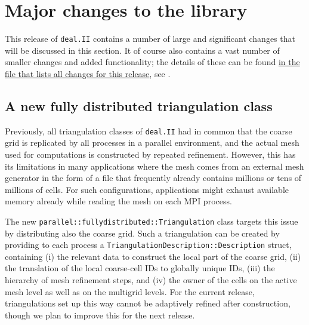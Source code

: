 \documentclass{ansarticle-preprint}
\newcommand{\specialword}[1]{\texttt{#1}}
\newcommand{\dealii}{{\specialword{deal.II}}\xspace}
\begin{document}
\section{Major changes to the library}
\label{sec:major}

This release of \dealii{} contains a number of large and significant changes
that will be discussed in this section.
It of course also contains a
vast number of smaller changes and added functionality; the details of these
can be found
\href{https://dealii.org/developer/doxygen/deal.II/changes_between_9_1_1_and_9_2_0.html}{
in the file that lists all changes for this release}, see \cite{changes92}.


\subsection{A new fully distributed triangulation class}
\label{subsec:pft}

Previously, all triangulation classes of \dealii{} had in common that the coarse grid is replicated by
all processes in a parallel environment, and the actual mesh used for computations is constructed by repeated
refinement. However, this has its limitations in many
applications where the mesh comes
from an external mesh generator in the form of a file that frequently
already contains millions
or tens of millions of cells. For such configurations, applications might exhaust
available memory already while reading the mesh on each MPI process.

The new \texttt{parallel::fullydistributed::Triangulation} class targets this issue
by distributing also the coarse grid. Such
a triangulation can be created by providing to each process a \texttt{Triangulation\-De\-scrip\-tion::Description} struct, containing
(i) the relevant data to construct the local part of the coarse grid, (ii) the
translation of the local coarse-cell IDs to globally unique IDs, (iii) the hierarchy
of mesh refinement steps, and (iv) the owner of the cells on the active mesh level as well
as on the multigrid levels. For the current release, triangulations set up
this way cannot be adaptively refined after construction, though we plan to
improve this for the next release.
\end{document}
